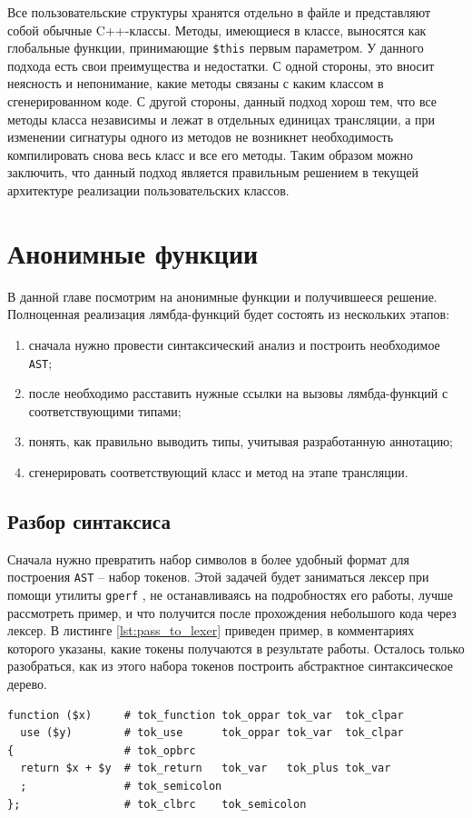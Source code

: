 Все пользовательские структуры хранятся отдельно в файле и представляют собой обычные C++-классы.
Методы, имеющиеся в классе, выносятся как глобальные функции, принимающие \verb|$this| первым параметром.
У данного подхода есть свои преимущества и недостатки.
С одной стороны, это вносит неясность и непонимание, какие методы связаны с каким классом в сгенерированном коде.
С другой стороны, данный подход хорош тем, что все методы класса независимы и лежат в отдельных единицах трансляции, а при изменении сигнатуры одного из методов не возникнет необходимость компилировать снова весь класс и все его методы.
Таким образом можно заключить, что данный подход является правильным решением в текущей архитектуре реализации пользовательских классов.

\section{Анонимные функции}
В данной главе посмотрим на анонимные функции и получившееся решение.
Полноценная реализация лямбда-функций будет состоять из нескольких этапов:
\begin{enumerate}
  \item сначала нужно провести синтаксический анализ и построить необходимое \verb|AST|;
  \item после необходимо расставить нужные ссылки на вызовы лямбда-функций с соответствующими типами;
  \item понять, как правильно выводить типы, учитывая разработанную аннотацию;
  \item сгенерировать соответствующий класс и метод на этапе трансляции.
\end{enumerate}

\subsection{Разбор синтаксиса}
Сначала нужно превратить набор символов в более удобный формат для построения \verb|AST| -- набор токенов.
Этой задачей будет заниматься лексер при помощи утилиты \verb|gperf| \cite[с.~461]{cpp_gems_gperf}, не останавливаясь на подробностях его работы, лучше рассмотреть пример, и что получится после прохождения небольшого кода через лексер.
В листинге \ref{lst:pass_to_lexer} приведен пример, в комментариях которого указаны, какие токены получаются в результате работы.
Осталось только разобраться, как из этого набора токенов построить абстрактное синтаксическое дерево.
\begin{lstlisting}[caption={Результат работы лексера},label={lst:pass_to_lexer}]
function ($x)     # tok_function tok_oppar tok_var  tok_clpar
  use ($y)        # tok_use      tok_oppar tok_var  tok_clpar
{                 # tok_opbrc
  return $x + $y  # tok_return   tok_var   tok_plus tok_var
  ;               # tok_semicolon
};                # tok_clbrc    tok_semicolon
\end{lstlisting}

